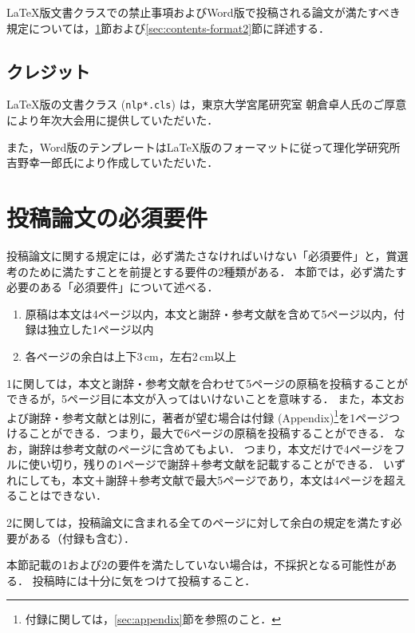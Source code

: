 \documentclass[
  platex, dvipdfmx,  %
]{nlp2024}
\newcommand{\code}[1]{\texttt{#1}}
\begin{document}
LaTeX版文書クラスでの禁止事項およびWord版で投稿される論文が満たすべき規定については，\ref{sec:contents-format1}節および\ref{sec:contents-format2}節に詳述する．


\subsection{クレジット}
LaTeX版の文書クラス (\code{nlp*.cls}) は，東京大学宮尾研究室 朝倉卓人氏のご厚意により年次大会用に提供していただいた．

また，Word版のテンプレートはLaTeX版のフォーマットに従って理化学研究所 吉野幸一郎氏により作成していただいた．




\section{投稿論文の必須要件}
\label{sec:contents-format1}

投稿論文に関する規定には，必ず満たさなければいけない「必須要件」と，賞選考のために満たすことを前提とする要件の2種類がある．
本節では，必ず満たす必要のある「必須要件」について述べる．

\begin{enumerate}
\item 原稿は本文は4ページ以内，本文と謝辞・参考文献を含めて5ページ以内，付録は独立した1ページ以内
\item 各ページの余白は上下3\,cm，左右2\,cm以上
\end{enumerate}

1に関しては，本文と謝辞・参考文献を合わせて5ページの原稿を投稿することができるが，5ページ目に本文が入ってはいけないことを意味する．
また，本文および謝辞・参考文献とは別に，著者が望む場合は付録 (Appendix)\footnote{付録に関しては，\ref{sec:appendix}節を参照のこと．}を1ページつけることができる．つまり，最大で6ページの原稿を投稿することができる．
なお，謝辞は参考文献のページに含めてもよい．
つまり，本文だけで4ページをフルに使い切り，残りの1ページで謝辞＋参考文献を記載することができる．
いずれにしても，本文＋謝辞＋参考文献で最大5ページであり，本文は4ページを超えることはできない．


2に関しては，投稿論文に含まれる全てのページに対して余白の規定を満たす必要がある（付録も含む）．

本節記載の1および2の要件を満たしていない場合は，不採択となる可能性がある．
投稿時には十分に気をつけて投稿すること．
\end{document}

